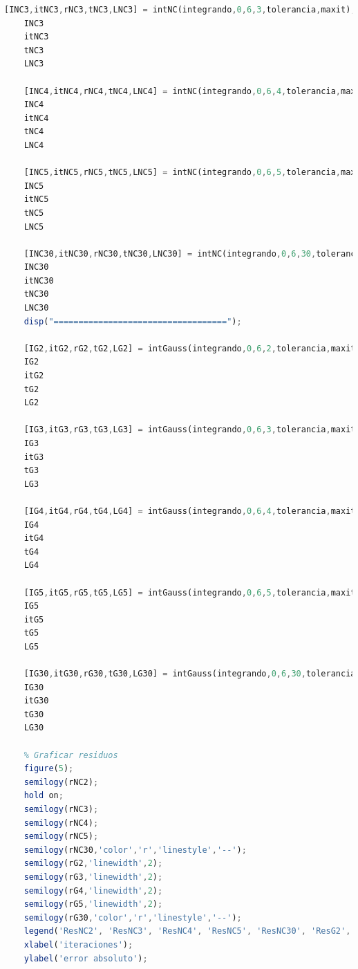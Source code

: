 \documentclass{article}
\begin{document}
\begin{lstlisting}[language=Octave]
    [INC3,itNC3,rNC3,tNC3,LNC3] = intNC(integrando,0,6,3,tolerancia,maxit);
    INC3
    itNC3
    tNC3
    LNC3
    
    [INC4,itNC4,rNC4,tNC4,LNC4] = intNC(integrando,0,6,4,tolerancia,maxit);
    INC4
    itNC4
    tNC4
    LNC4
    
    [INC5,itNC5,rNC5,tNC5,LNC5] = intNC(integrando,0,6,5,tolerancia,maxit);
    INC5
    itNC5
    tNC5
    LNC5
    
    [INC30,itNC30,rNC30,tNC30,LNC30] = intNC(integrando,0,6,30,tolerancia,maxit);
    INC30
    itNC30
    tNC30
    LNC30
    disp("===================================");
    
    [IG2,itG2,rG2,tG2,LG2] = intGauss(integrando,0,6,2,tolerancia,maxit);
    IG2
    itG2
    tG2
    LG2
    
    [IG3,itG3,rG3,tG3,LG3] = intGauss(integrando,0,6,3,tolerancia,maxit);
    IG3
    itG3
    tG3
    LG3
    
    [IG4,itG4,rG4,tG4,LG4] = intGauss(integrando,0,6,4,tolerancia,maxit);
    IG4
    itG4
    tG4
    LG4
    
    [IG5,itG5,rG5,tG5,LG5] = intGauss(integrando,0,6,5,tolerancia,maxit);
    IG5
    itG5
    tG5
    LG5
    
    [IG30,itG30,rG30,tG30,LG30] = intGauss(integrando,0,6,30,tolerancia,maxit);
    IG30
    itG30
    tG30
    LG30
    
    % Graficar residuos
    figure(5);
    semilogy(rNC2);
    hold on;
    semilogy(rNC3);
    semilogy(rNC4);
    semilogy(rNC5);
    semilogy(rNC30,'color','r','linestyle','--');
    semilogy(rG2,'linewidth',2);
    semilogy(rG3,'linewidth',2);
    semilogy(rG4,'linewidth',2);
    semilogy(rG5,'linewidth',2);
    semilogy(rG30,'color','r','linestyle','--');
    legend('ResNC2', 'ResNC3', 'ResNC4', 'ResNC5', 'ResNC30', 'ResG2', 'ResG3', 'ResG4', 'ResG5', 'ResG30');
    xlabel('iteraciones');
    ylabel('error absoluto');
    \end{lstlisting}
\end{document}
